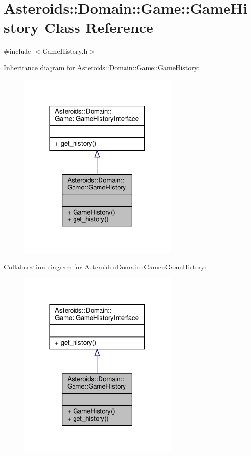 \hypertarget{classAsteroids_1_1Domain_1_1Game_1_1GameHistory}{}\section{Asteroids\+:\+:Domain\+:\+:Game\+:\+:Game\+History Class Reference}
\label{classAsteroids_1_1Domain_1_1Game_1_1GameHistory}


{\ttfamily \#include $<$Game\+History.\+h$>$}



Inheritance diagram for Asteroids\+:\+:Domain\+:\+:Game\+:\+:Game\+History\+:\nopagebreak
\begin{figure}[H]
\begin{center}
\leavevmode
\includegraphics[width=225pt]{classAsteroids_1_1Domain_1_1Game_1_1GameHistory__inherit__graph}
\end{center}
\end{figure}


Collaboration diagram for Asteroids\+:\+:Domain\+:\+:Game\+:\+:Game\+History\+:\nopagebreak
\begin{figure}[H]
\begin{center}
\leavevmode
\includegraphics[width=225pt]{classAsteroids_1_1Domain_1_1Game_1_1GameHistory__coll__graph}
\end{center}
\end{figure}

